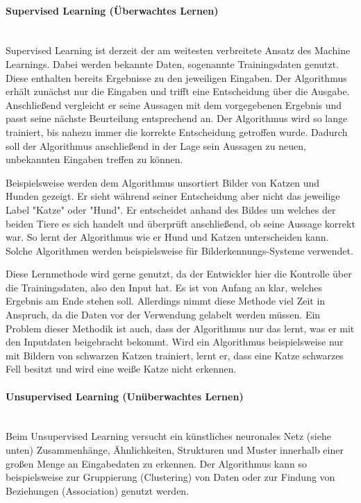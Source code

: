 \documentclass[a4paper,12pt, german]{report}
\begin{document}
\paragraph{Supervised Learning (Überwachtes Lernen)} $ $ \\ Supervised Learning ist derzeit der am weitesten verbreitete Ansatz des Machine Learnings. Dabei werden bekannte Daten, sogenannte Trainingsdaten genutzt. Diese enthalten bereits Ergebnisse zu den jeweiligen Eingaben. Der Algorithmus erhält zunächst nur die Eingaben und trifft eine Entscheidung über die Ausgabe. Anschließend vergleicht er seine Aussagen mit dem vorgegebenen Ergebnis und passt seine nächste Beurteilung entsprechend an. Der Algorithmus wird so lange trainiert, bis nahezu immer die korrekte Entscheidung getroffen wurde. Dadurch soll der Algorithmus anschließend in der Lage sein Aussagen zu neuen, unbekannten Eingaben treffen zu können.\cite{01}\cite{05}

Beispielsweise werden dem Algorithmus unsortiert Bilder von Katzen und Hunden gezeigt. Er sieht während seiner Entscheidung aber nicht das jeweilige Label "Katze" oder "Hund". Er entscheidet anhand des Bildes um welches der beiden Tiere es sich handelt und überprüft anschließend, ob seine Aussage korrekt war. So lernt der Algorithmus wie er Hund und Katzen unterscheiden kann. Solche Algorithmen werden beispielsweise für Bilderkennungs-Systeme verwendet. 

Diese Lernmethode wird gerne genutzt, da der Entwickler hier die Kontrolle über die Trainingsdaten, also den Input hat. Es ist von Anfang an klar, welches Ergebnis am Ende stehen soll. Allerdings nimmt diese Methode viel Zeit in Anspruch, da die Daten vor der Verwendung gelabelt werden müssen. Ein Problem dieser Methodik ist auch, dass der Algorithmus nur das lernt, was er mit den Inputdaten beigebracht bekommt. Wird ein Algorithmus beispielsweise nur mit Bildern von schwarzen Katzen trainiert, lernt er, dass eine Katze schwarzes Fell besitzt und wird eine weiße Katze nicht erkennen.

\paragraph{Unsupervised Learning (Unüberwachtes Lernen)} $  $ \\ Beim Unsupervised Learning versucht ein künstliches neuronales Netz (siehe unten) Zusammenhänge, Ähnlichkeiten, Strukturen und Muster innerhalb einer großen Menge an Eingabedaten zu erkennen. Der Algorithmus kann so beispielsweise zur Gruppierung (Clustering) von Daten oder zur Findung von Beziehungen (Association) genutzt werden.\cite{01}
\end{document}

